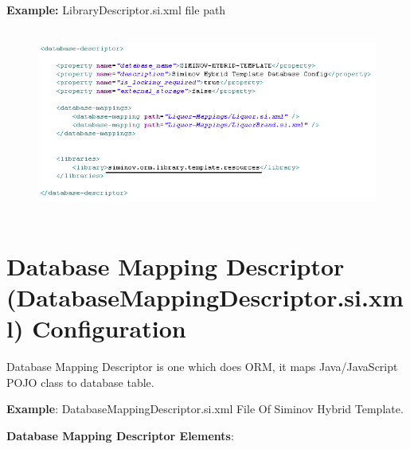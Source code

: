 		\par
		\textbf{Example:} LibraryDescriptor.si.xml file path
		\begin{figure}[htbp]
			\centering
				\includegraphics[height=6.2cm]{Resources/siminov_library_template_path_example.png}
		\end{figure}



\newpage
\section{Database Mapping Descriptor (DatabaseMappingDescriptor.si.xml) Configuration}
	
Database Mapping Descriptor is one which does ORM, it maps Java/JavaScript POJO class to database table.



\textbf{Example}: DatabaseMappingDescriptor.si.xml File Of Siminov Hybrid Template.



\newpage
\textbf{Database Mapping Descriptor Elements}:



